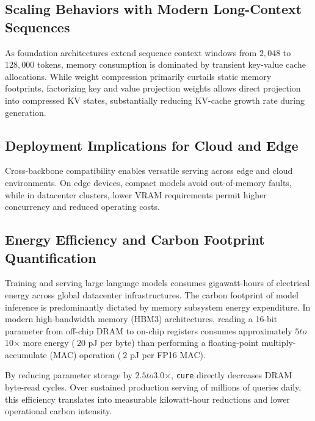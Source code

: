 \subsection{Scaling Behaviors with Modern Long-Context Sequences}
As foundation architectures extend sequence context windows from $2{,}048$ to $128{,}000$ tokens, memory consumption is dominated by transient key-value cache allocations. While weight compression primarily curtails static memory footprints, factorizing key and value projection weights allows direct projection into compressed KV states, substantially reducing KV-cache growth rate during generation.

\subsection{Deployment Implications for Cloud and Edge}
Cross-backbone compatibility enables versatile serving across edge and cloud environments. On edge devices, compact models avoid out-of-memory faults, while in datacenter clusters, lower VRAM requirements permit higher concurrency and reduced operating costs.

\subsection{Energy Efficiency and Carbon Footprint Quantification}
Training and serving large language models consumes gigawatt-hours of electrical energy across global datacenter infrastructures. The carbon footprint of model inference is predominantly dictated by memory subsystem energy expenditure. In modern high-bandwidth memory (HBM3) architectures, reading a 16-bit parameter from off-chip DRAM to on-chip registers consumes approximately $5$\times$ to $10$\times$ more energy ($~20$ pJ per byte) than performing a floating-point multiply-accumulate (MAC) operation ($~2$ pJ per FP16 MAC).

By reducing parameter storage by $2.5$\times$ to $3.0$\times$, \texttt{cure} directly decreases DRAM byte-read cycles. Over sustained production serving of millions of queries daily, this efficiency translates into measurable kilowatt-hour reductions and lower operational carbon intensity.
